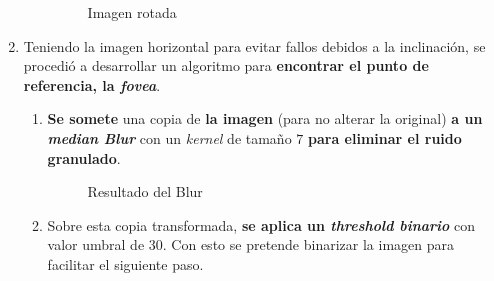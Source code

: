 \begin{enumerate}
\begin{enumerate}[label*=\arabic*.]
    \begin{figure}[H]
      \caption{Imagen rotada}
      \centering \setlength\fboxsep{0pt} \setlength\fboxrule{0.5pt}
    \end{figure}

  \end{enumerate}

\item Teniendo la imagen horizontal para evitar fallos debidos a la
  inclinación, se procedió a desarrollar un algoritmo para
  \textbf{encontrar el punto de referencia, la \emph{\gls{fovea}}}.
  \begin{enumerate}[label*=\arabic*.]
  \item \textbf{Se somete} una copia de \textbf{la imagen} (para no
    alterar la original) \textbf{a un \emph{median
        Blur}} con un \emph{kernel} de
    tamaño $7$ \textbf{para eliminar el ruido granulado}.

    \begin{figure}[H]
      \caption{Resultado del Blur}
      \centering \setlength\fboxsep{0pt} \setlength\fboxrule{0.5pt}
    \end{figure}

  \item Sobre esta copia transformada, \textbf{se aplica un
      \emph{threshold binario}} con valor umbral de $30$. Con esto se
    pretende binarizar la imagen para facilitar el siguiente paso.


\end{enumerate}
\end{enumerate}
